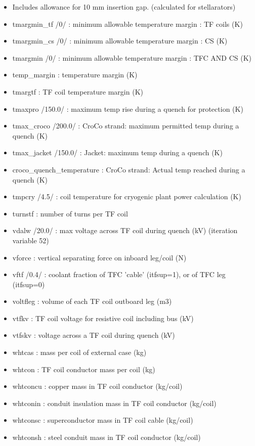 \documentclass[]{article}
\begin{document}
\begin{itemize}
  (m)
\item
  Includes allowance for 10 mm insertion gap. (calculated for
  stellarators)
\item
  tmargmin\_tf /0/ : minimum allowable temperature margin : TF coils (K)
\item
  tmargmin\_cs /0/ : minimum allowable temperature margin : CS (K)
\item
  tmargmin /0/ : minimum allowable temperature margin : TFC AND CS (K)
\item
  temp\_margin : temperature margin (K)
\item
  tmargtf : TF coil temperature margin (K)
\item
  tmaxpro /150.0/ : maximum temp rise during a quench for protection (K)
\item
  tmax\_croco /200.0/ : CroCo strand: maximum permitted temp during a
  quench (K)
\item
  tmax\_jacket /150.0/ : Jacket: maximum temp during a quench (K)
\item
  croco\_quench\_temperature : CroCo strand: Actual temp reached during
  a quench (K)
\item
  tmpcry /4.5/ : coil temperature for cryogenic plant power calculation
  (K)
\item
  turnstf : number of turns per TF coil
\item
  vdalw /20.0/ : max voltage across TF coil during quench (kV)
  (iteration variable 52)
\item
  vforce : vertical separating force on inboard leg/coil (N)
\item
  vftf /0.4/ : coolant fraction of TFC 'cable' (itfsup=1), or of TFC leg
  (itfsup=0)
\item
  voltfleg : volume of each TF coil outboard leg (m3)
\item
  vtfkv : TF coil voltage for resistive coil including bus (kV)
\item
  vtfskv : voltage across a TF coil during quench (kV)
\item
  whtcas : mass per coil of external case (kg)
\item
  whtcon : TF coil conductor mass per coil (kg)
\item
  whtconcu : copper mass in TF coil conductor (kg/coil)
\item
  whtconin : conduit insulation mass in TF coil conductor (kg/coil)
\item
  whtconsc : superconductor mass in TF coil cable (kg/coil)
\item
  whtconsh : steel conduit mass in TF coil conductor (kg/coil)

\end{itemize}
\end{document}
